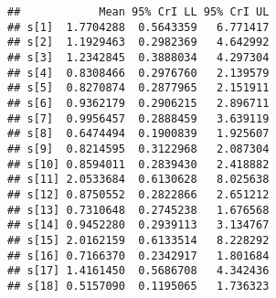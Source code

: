 \documentclass[]{article}
\newenvironment{Shaded}{\begin{snugshade}}{\end{snugshade}}
\newcommand{\CommentTok}[1]{\textcolor[rgb]{0.56,0.35,0.01}{\textit{#1}}}
\newcommand{\ControlFlowTok}[1]{\textcolor[rgb]{0.13,0.29,0.53}{\textbf{#1}}}
\newcommand{\DataTypeTok}[1]{\textcolor[rgb]{0.13,0.29,0.53}{#1}}
\newcommand{\DecValTok}[1]{\textcolor[rgb]{0.00,0.00,0.81}{#1}}
\newcommand{\FloatTok}[1]{\textcolor[rgb]{0.00,0.00,0.81}{#1}}
\newcommand{\KeywordTok}[1]{\textcolor[rgb]{0.13,0.29,0.53}{\textbf{#1}}}
\newcommand{\NormalTok}[1]{#1}
\newcommand{\OperatorTok}[1]{\textcolor[rgb]{0.81,0.36,0.00}{\textbf{#1}}}
\newcommand{\StringTok}[1]{\textcolor[rgb]{0.31,0.60,0.02}{#1}}
\begin{document}
\begin{Shaded}
\end{Shaded}

\begin{verbatim}
##            Mean 95% CrI LL 95% CrI UL
## s[1]  1.7704288  0.5643359   6.771417
## s[2]  1.1929463  0.2982369   4.642992
## s[3]  1.2342845  0.3888034   4.297304
## s[4]  0.8308466  0.2976760   2.139579
## s[5]  0.8270874  0.2877965   2.151911
## s[6]  0.9362179  0.2906215   2.896711
## s[7]  0.9956457  0.2888459   3.639119
## s[8]  0.6474494  0.1900839   1.925607
## s[9]  0.8214595  0.3122968   2.087304
## s[10] 0.8594011  0.2839430   2.418882
## s[11] 2.0533684  0.6130628   8.025638
## s[12] 0.8750552  0.2822866   2.651212
## s[13] 0.7310648  0.2745238   1.676568
## s[14] 0.9452280  0.2939113   3.134767
## s[15] 2.0162159  0.6133514   8.228292
## s[16] 0.7166370  0.2342917   1.801684
## s[17] 1.4161450  0.5686708   4.342436
## s[18] 0.5157090  0.1195065   1.736323
\end{verbatim}
\end{document}
